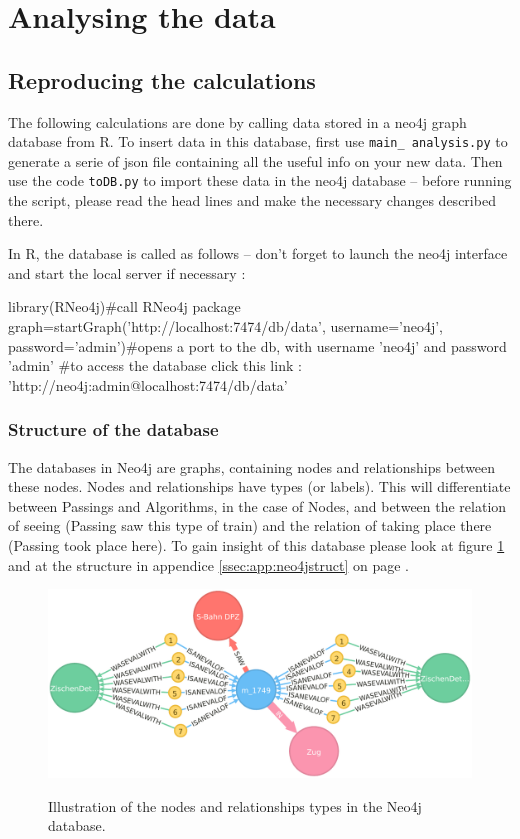 \documentclass{article}\usepackage[]{graphicx}\usepackage[]{color}
\begin{document}
\section{Analysing the data}

\subsection{Reproducing the calculations}
The following calculations are done by calling data stored in a neo4j graph database from R. To insert data in this database, first use {\tt main\_ analysis.py} to generate a serie of json file containing all the useful info on your new data. Then use the code {\tt toDB.py} to import these data in the neo4j database -- before running the script, please read the head lines and make the necessary changes described there.

In R, the database is called as follows -- don't forget to launch the neo4j interface and start the local server if necessary :

\begin{Schunk}
\begin{Sinput}
library(RNeo4j)#call RNeo4j package
graph=startGraph('http://localhost:7474/db/data', username='neo4j', password='admin')#opens a port to the db, with username 'neo4j' and password 'admin'
#to access the database click this link : 'http://neo4j:admin@localhost:7474/db/data'
\end{Sinput}
\end{Schunk}

\subsubsection{Structure of the database}

The databases in Neo4j are graphs, containing nodes and relationships between these nodes. Nodes and relationships have types (or labels). This will differentiate between Passings and Algorithms, in the case of Nodes, and between the relation of seeing (Passing saw this type of train) and the relation of taking place there (Passing took place here). To gain insight of this database please look at figure \ref{fig:neo4jdb} and at the structure in appendice {\ref{ssec:app:neo4jstruct}} on page {\pageref{ssec:app:neo4jstruct}}.

\begin{figure}
\centering
\includegraphics[width=\textwidth]{img/graph.pdf}
\label{graphneo4j}
\caption{Illustration of the nodes and relationships types in the Neo4j database.}
\label{fig:neo4jdb}
\end{figure}
\end{document}
